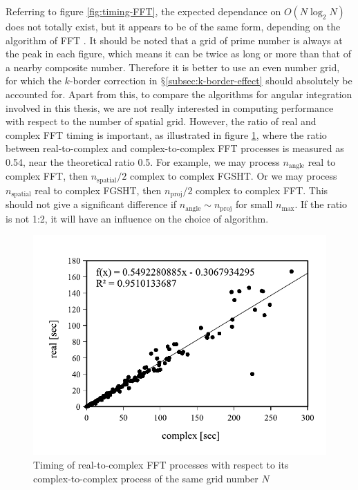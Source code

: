 Referring to figure \ref{fig:timing-FFT}, the expected dependance
on $O(N\log_{2}N)$ \citep{Numerical_Recipes_3ed} does not totally
exist, but it appears to be of the same form, depending on the algorithm
of \acs{FFT} \citep{Briggs-DFT}. It should be noted that a grid
of prime number is always at the peak in each figure, which means
it can be twice as long or more than that of a nearby composite number.
Therefore it is better to use an even number grid, for which the $k$-border
correction in $\mathsection$\ref{subsec:k-border-effect} should
absolutely be accounted for. Apart from this, to compare
the algorithms for angular integration involved in this thesis, we
are not really interested in computing performance with respect to
the number of spatial grid. However, the ratio of real and complex
\acs{FFT} timing is important, as illustrated in figure \ref{fig:fft-real-to-complex},
where the ratio between real-to-complex and complex-to-complex \acs{FFT}
processes is measured as 0.54, near the theoretical ratio 0.5. For
example, we may process $n_{\mathrm{angle}}$ real to complex \acs{FFT},
then $n_{\mathrm{spatial}}/2$ complex to complex \acs{FGSHT}. Or
we may process $n_{\mathrm{spatial}}$ real to complex \acs{FGSHT},
then $n_{\mathrm{proj}}/2$ complex to complex \acs{FFT}. This should
not give a significant difference if $n_{\mathrm{angle}}\sim n_{\mathrm{proj}}$
for small $n_{\max}$. If the ratio is not 1:2, it will have an influence
on the choice of algorithm.
\begin{center}
\begin{figure}[h]
\begin{centering}
\includegraphics[bb=0bp 20bp 340bp 235bp,width=0.55\columnwidth]{_figure/results/fftw_real_v_cmplx}
\par\end{centering}
\caption{Timing of real-to-complex \acs{FFT} processes with respect to its
complex-to-complex process of the same grid number $N$\label{fig:fft-real-to-complex}}
\end{figure}
\par\end{center}

